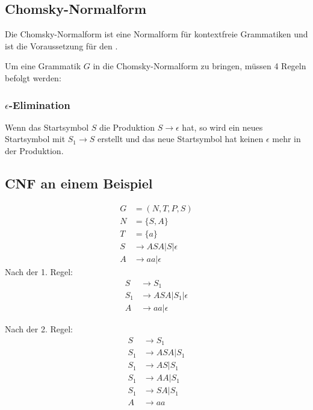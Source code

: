 \subsection{Chomsky-Normalform}
\label{cnf}
\begin{definition}
    Die Chomsky-Normalform ist eine Normalform für kontextfreie Grammatiken und ist die Voraussetzung für den .
\end{definition}
Um eine Grammatik $G$ in die Chomsky-Normalform zu bringen, müssen 4 Regeln befolgt werden:
\subsubsection[Epsilon-Elimination]{$\epsilon$-Elimination}
Wenn das Startsymbol $S$ die Produktion $S\to \epsilon$ hat, so wird ein neues Startsymbol mit $S_1 \to S$ erstellt und das neue Startsymbol hat keinen $\epsilon$ mehr in der Produktion.\par
\subsection{CNF an einem Beispiel}
\begin{align*}
    G&=(N,T,P,S)\\
    N&=\{S,A\}\\
    T&=\{a\}\\
    S&\to ASA|S|\epsilon\\
    A&\to aa|\epsilon
\end{align*}
Nach der 1. Regel:
\begin{align*}
    S&\to S_1\\
    S_1&\to ASA|S_1|\epsilon\\
    A&\to aa|\epsilon
\end{align*}

Nach der 2. Regel:
\begin{align*}
    S&\to S_1\\
    S_1&\to ASA|S_1\\
    S_1&\to AS|S_1\\
    S_1&\to AA|S_1\\
    S_1&\to SA|S_1\\
    A&\to aa
\end{align*}
